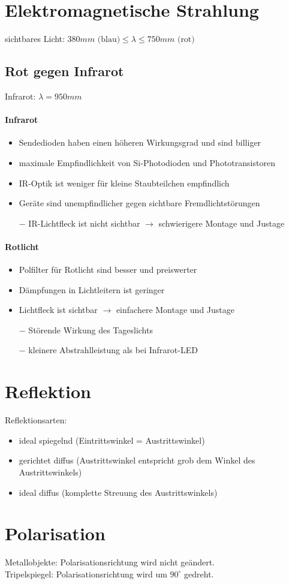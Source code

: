 \section{Elektromagnetische Strahlung}
sichtbares Licht:
$380\unit{mm}\text{ (blau)} \leq \lambda \leq 750 \unit{mm} \text{ (rot)}$

\subsection{Rot gegen Infrarot}
Infrarot: $\lambda = 950 \unit{mm}$
\paragraph{Infrarot}
\begin{itemize}[label=$+$]
\item Sendedioden haben einen höheren Wirkungsgrad und sind billiger
\item maximale Empfindlichkeit von Si-Photodioden und Phototransistoren
\item IR-Optik ist weniger für kleine Staubteilchen empfindlich
\item Geräte sind unempfindlicher gegen sichtbare Fremdlichtstörungen
\item[$-$] IR-Lichtfleck ist nicht sichtbar $\to$ schwierigere Montage und Justage
\end{itemize}
\paragraph{Rotlicht}
\begin{itemize}[label=$+$]
\item Polfilter für Rotlicht sind besser und preiswerter
\item Dämpfungen in Lichtleitern ist geringer
\item Lichtfleck ist sichtbar $\to$ einfachere Montage und Justage
\item[$-$] Störende Wirkung des Tageslichts
\item[$-$] kleinere Abstrahlleistung als bei Infrarot-LED
\end{itemize}

\section{Reflektion}
Reflektionsarten:
\begin{itemize}
\item ideal spiegelnd (Eintrittswinkel = Austrittswinkel)
\item gerichtet diffus (Austrittswinkel entspricht grob dem Winkel des Austrittswinkels)
\item ideal diffus (komplette Streuung des Austrittswinkels)
\end{itemize}

\section{Polarisation}
Metallobjekte: Polarisationsrichtung wird nicht geändert.\\
Tripelspiegel: Polarisationsrichtung wird um $90^\circ$ gedreht.



